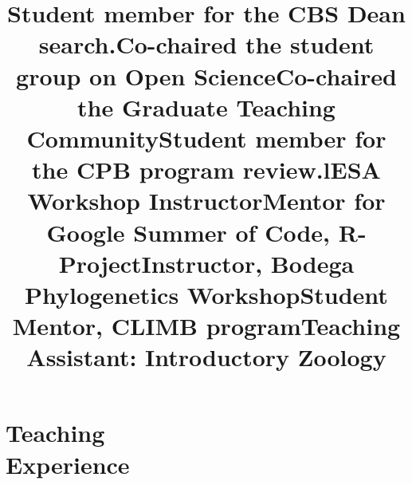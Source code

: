 \documentclass[margin]{res}
\begin{document}
\begin{resume}
\title{Student  member for the CBS Dean search.}
\begin{position} \vspace{-.8cm} \end{position}
\title{Co-chaired the student group on Open Science}
\begin{position} \vspace{-.8cm} \end{position}
\title{Co-chaired the Graduate Teaching Community}
\begin{position} \vspace{-.8cm} \end{position}
\title{Student member for the CPB program review.}
\begin{position} \vspace{0cm} \end{position}


\section{Teaching\\Experience}
\begin{format}
\title{l}\\
\body
\end{format}

\title{ESA Workshop Instructor}
\begin{position} \vspace{-.8cm} \end{position}
\title{Mentor for Google Summer of Code, R-Project}
\begin{position} \vspace{-.8cm} \end{position}
\title{Instructor, Bodega Phylogenetics Workshop}
\begin{position} \vspace{-.8cm} \end{position}
\title{Student Mentor, CLIMB program}
\begin{position} \vspace{-.8cm} \end{position}
\title{Teaching Assistant: Introductory Zoology}
 \begin{position} \vspace{-.0cm} \end{position}





\end{resume}
\end{document}
